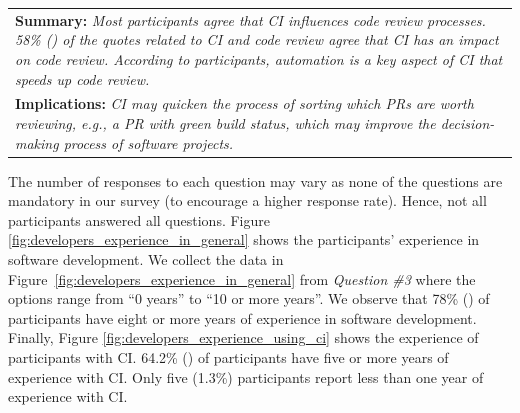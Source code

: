 	\begin{center}
		\begin{tabular}{|p{}|}
			\hline
			\textbf{Summary:}
			\textit{Most participants agree that CI influences code review processes. 58\% (\nicefrac{335}{578}) of the quotes related to CI and code review agree that CI has an impact on code review. According to participants, automation is a key aspect of CI that speeds up code review.}\\
			\textbf{Implications:}
			\textit{CI may quicken the process of sorting which PRs are worth reviewing, e.g., a PR with green build status, which may improve the decision-making process of software projects.}
			\\
			\hline
		\end{tabular}
	\end{center}
The number of responses to each question may vary as none of the questions are mandatory in our survey (to encourage a higher response rate). Hence, not all participants answered all questions. 
Figure \ref{fig:developers_experience_in_general} shows the participants' experience in software development. 
We collect the data in Figure~\ref{fig:developers_experience_in_general} from \textit{Question \#3} where the options range from ``0 years'' to ``10 or more years''. We observe that 78\% () of participants have eight or more years of experience in software development. 
Finally, Figure \ref{fig:developers_experience_using_ci} shows the experience of participants with CI. 64.2\% () of participants have five or more years of experience with CI. Only five (1.3\%) participants report less than one year of experience with CI. 

